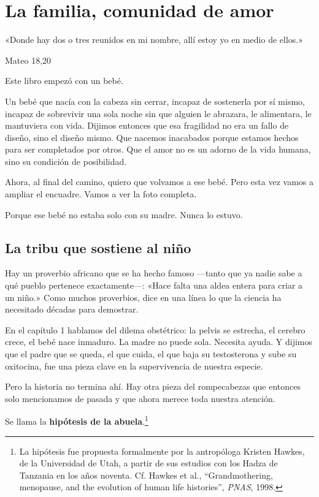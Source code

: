 \chapter{La familia, comunidad de amor}

\epigraph{«Donde hay dos o tres reunidos en mi nombre, allí estoy yo en medio de ellos.»}{Mateo 18,20}

Este libro empezó con un bebé.

Un bebé que nacía con la cabeza sin cerrar, incapaz de sostenerla por sí mismo, incapaz de sobrevivir una sola noche sin que alguien le abrazara, le alimentara, le mantuviera con vida. Dijimos entonces que esa fragilidad no era un fallo de diseño, sino el diseño mismo. Que nacemos inacabados porque estamos hechos para ser completados por otros. Que el amor no es un adorno de la vida humana, sino su condición de posibilidad.

Ahora, al final del camino, quiero que volvamos a ese bebé. Pero esta vez vamos a ampliar el encuadre. Vamos a ver la foto completa.

Porque ese bebé no estaba solo con su madre. Nunca lo estuvo.

\section{La tribu que sostiene al niño}

Hay un proverbio africano que se ha hecho famoso ---tanto que ya nadie sabe a qué pueblo pertenece exactamente---: «Hace falta una aldea entera para criar a un niño.» Como muchos proverbios, dice en una línea lo que la ciencia ha necesitado décadas para demostrar.

En el capítulo 1 hablamos del dilema obstétrico: la pelvis se estrecha, el cerebro crece, el bebé nace inmaduro. La madre no puede sola. Necesita ayuda. Y dijimos que el padre que se queda, el que cuida, el que baja su testosterona y sube su oxitocina, fue una pieza clave en la supervivencia de nuestra especie.

Pero la historia no termina ahí. Hay otra pieza del rompecabezas que entonces solo mencionamos de pasada y que ahora merece toda nuestra atención.

Se llama la \textbf{hipótesis de la abuela}.\footnote{La hipótesis fue propuesta formalmente por la antropóloga Kristen Hawkes, de la Universidad de Utah, a partir de sus estudios con los Hadza de Tanzania en los años noventa. Cf. Hawkes et al., ``Grandmothering, menopause, and the evolution of human life histories'', \textit{PNAS}, 1998.}

